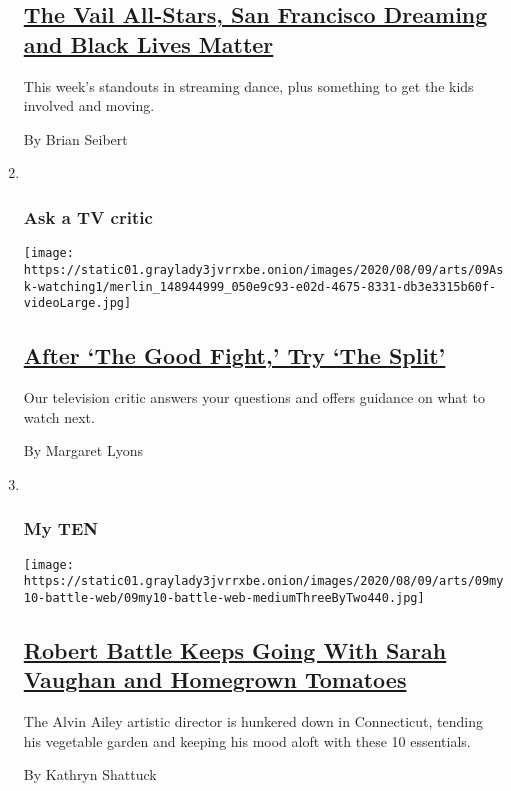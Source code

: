 \begin{enumerate}
{  \subsection{\texorpdfstring{\href{/2020/08/04/arts/dance/the-best-in-streaming-dance.html}{The
  Vail All-Stars, San Francisco Dreaming and Black Lives
  Matter}}{The Vail All-Stars, San Francisco Dreaming and Black Lives Matter}}\label{the-vail-all-stars-san-francisco-dreaming-and-black-lives-matter}}

  This week's standouts in streaming dance, plus something to get the
  kids involved and moving.

  By Brian Seibert
\item ~
  \hypertarget{ask-a-tv-critic}{%
  \subsubsection{Ask a TV critic}\label{ask-a-tv-critic}}

  \texttt{[image: https://static01.graylady3jvrrxbe.onion/images/2020/08/09/arts/09Ask-watching1/merlin\_148944999\_050e9c93-e02d-4675-8331-db3e3315b60f-videoLarge.jpg]}

  \hypertarget{after-the-good-fight-try-the-split}{%
  \subsection{\texorpdfstring{\href{/2020/08/04/arts/television/the-good-fight-the-split.html}{After
  `The Good Fight,' Try `The
  Split'}}{After `The Good Fight,' Try `The Split'}}\label{after-the-good-fight-try-the-split}}

  Our television critic answers your questions and offers guidance on
  what to watch next.

  By Margaret Lyons
\item ~
  \hypertarget{my-ten}{%
  \subsubsection{My TEN}\label{my-ten}}

  \texttt{[image: https://static01.graylady3jvrrxbe.onion/images/2020/08/09/arts/09my10-battle-web/09my10-battle-web-mediumThreeByTwo440.jpg]}

  \hypertarget{robert-battle-keeps-going-with-sarah-vaughan-and-homegrown-tomatoes}{%
  \subsection{\texorpdfstring{\href{/2020/08/04/arts/dance/robert-battle-favorites.html}{Robert
  Battle Keeps Going With Sarah Vaughan and Homegrown
  Tomatoes}}{Robert Battle Keeps Going With Sarah Vaughan and Homegrown Tomatoes}}\label{robert-battle-keeps-going-with-sarah-vaughan-and-homegrown-tomatoes}}

  The Alvin Ailey artistic director is hunkered down in Connecticut,
  tending his vegetable garden and keeping his mood aloft with these 10
  essentials.

  By Kathryn Shattuck
\end{enumerate}

